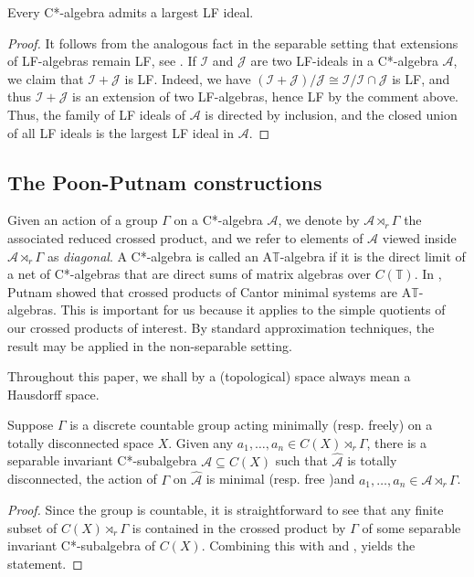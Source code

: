\documentclass[12pt, a4paper, oneside]{amsart}
\newcommand{\0}{\mathbf{0}}
\newcommand{\1}{\mathbf{1}}
\newcommand{\A}{\mathscr{A}}
\newcommand{\I}{\mathscr{I}}
\newcommand{\J}{\mathscr{J}}
\newcommand{\T}{\mathbb{T}}
\begin{document}
	\begin{proposition}
		\label{prop_LF}
		Every C*-algebra admits a largest LF ideal. 
	\end{proposition}
	
	\begin{proof}
		It follows from the analogous fact in the separable setting that extensions of LF-algebras remain LF, see \cite[Theorem 1.13]{bice2019c}. If \(\I\) and \(\J\) are two LF-ideals in a C*-algebra \(\A\), we claim that \(\I+\J\) is LF. Indeed, we have \((\I+\J)/\J \cong \I/\I \cap \J\) is LF, and thus \(\I+\J\) is an extension of two LF-algebras, hence LF by the comment above. Thus, the family of LF ideals of \(\A\) is directed by inclusion, and the closed union of all LF ideals is the largest LF ideal in \(\A\). 
	\end{proof}

	\subsection{The Poon-Putnam constructions}
	
	Given an action of a group \(\Gamma\) on a C*-algebra \(\A\), we denote by \(\A \rtimes_r \Gamma\) the associated reduced crossed product, and we refer to elements of \(\A\) viewed inside \(\A \rtimes_r \Gamma\) as \textit{diagonal}. A C*-algebra is called an A\(\T\)-algebra if it is the direct limit of a net of C*-algebras that are direct sums of matrix algebras over \(C(\T)\). In \cite{putnam}, Putnam showed that crossed products of Cantor minimal systems are A\(\T\)-algebras. This is important for us because it applies to the simple quotients of our crossed products of interest. By standard approximation techniques, the result may be applied in the non-separable setting. 
	
	Throughout this paper, we shall by a (topological) space always mean a Hausdorff space. 
	
	\begin{lemma}
		\label{lemma_approx}
		Suppose \(\Gamma\) is a discrete countable group acting minimally (resp. freely) on a totally disconnected space \(X\). Given any \(a_1, \ldots, a_n \in C(X) \rtimes_r \Gamma\), there is a separable invariant C*-subalgebra \(\A \subseteq C(X)\) such that \(\widehat{\A}\) is totally disconnected, the action of \(\Gamma\) on \(\widehat{\A}\) is minimal (resp. free )and \(a_1, \ldots, a_n \in \A \rtimes_r \Gamma\). 
	\end{lemma}
	
	\begin{proof}
		Since the group is countable, it is straightforward to see that any finite subset of \(C(X) \rtimes_r \Gamma\) is contained in the crossed product by \(\Gamma\) of some separable invariant C*-subalgebra of \(C(X)\). Combining this with \cite[Proposition 2.2]{blackadar_weak} and \cite[Lemma 2.5.2]{sierakowski_thesis}, yields the statement. 
	\end{proof}
	
\end{document}
